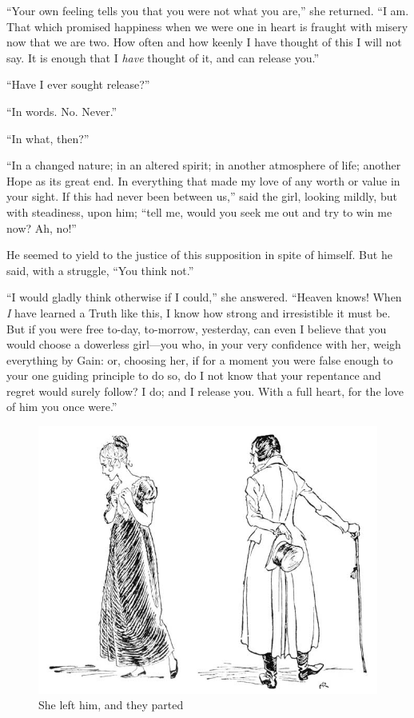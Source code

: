 \documentclass[paper=a5,BCOR=15mm,twoside,DIV=15,headinclude=off,12pt,chapterprefix=off,openany,headings=huge]{scrbook} %
\begin{document}
\enquote{Your own feeling tells you that you were not what you are,} she returned. \enquote{I am. That which promised happiness when we were one in heart is fraught with misery now that we are two. How often and how keenly I have thought of this I will not say. It is enough that I \textit{have} thought of it, and can release you.}

\enquote{Have I ever sought release?}

\enquote{In words. No. Never.}

\enquote{In what, then?}

\enquote{In a changed nature; in an altered spirit; in another atmosphere of life; another Hope as its great end. In everything that made my love of any worth or value in your sight. If this had never been between us,} said the girl, looking mildly, but with steadiness, upon him; \enquote{tell me, would you seek me out and try to win me now? Ah, no!}

He seemed to yield to the justice of this supposition in spite of himself. But he said, with a struggle, \enquote{You think not.}

\enquote{I would gladly think otherwise if I could,} she answered. \enquote{Heaven knows! When \textit{I} have learned a Truth like this, I know how strong and irresistible it must be. But if you were free to-day, to-morrow, yesterday, can even I believe that you would choose a dowerless girl—you who, in your very confidence with her, weigh everything by Gain: or, choosing her, if for a moment you were false enough to your one guiding principle to do so, do I not know that your repentance and regret would surely follow? I do; and I release you. With a full heart, for the love of him you once were.}

\begin{figure}
\begin{minipage}[c]{\linewidth}
\includegraphics[width=\linewidth]{gs081}
\caption*{She left him, and they parted}
\end{minipage}
\end{figure}
\end{document}
